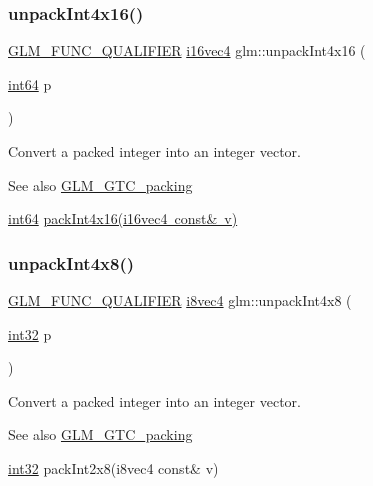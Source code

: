 \subsubsection{\texorpdfstring{unpack\+Int4x16()}{unpackInt4x16()}}
{\footnotesize\ttfamily \mbox{\hyperlink{setup_8hpp_a33fdea6f91c5f834105f7415e2a64407}{G\+L\+M\+\_\+\+F\+U\+N\+C\+\_\+\+Q\+U\+A\+L\+I\+F\+I\+ER}} \mbox{\hyperlink{group__gtc__type__precision_ga99a249a4cc129cb527c48d3afd38b666}{i16vec4}} glm\+::unpack\+Int4x16 (\begin{DoxyParamCaption}\item[{\mbox{\hyperlink{group__gtc__type__precision_ga435d75819cce297cc5fa21bd84ef89a5}{int64}}}]{p }\end{DoxyParamCaption})}

Convert a packed integer into an integer vector.

\begin{DoxySeeAlso}{See also}
\mbox{\hyperlink{group__gtc__packing}{G\+L\+M\+\_\+\+G\+T\+C\+\_\+packing}} 

\mbox{\hyperlink{group__gtc__type__precision_ga435d75819cce297cc5fa21bd84ef89a5}{int64}} \mbox{\hyperlink{group__gtc__packing_gac3ef78d62735b5c34503c33e37e401c2}{pack\+Int4x16(i16vec4 const\& v)}} 
\end{DoxySeeAlso}
\mbox{\label{group__gtc__packing_gaeed27076c5d26f4cca0d06637d3e878c}} 
\subsubsection{\texorpdfstring{unpack\+Int4x8()}{unpackInt4x8()}}
{\footnotesize\ttfamily \mbox{\hyperlink{setup_8hpp_a33fdea6f91c5f834105f7415e2a64407}{G\+L\+M\+\_\+\+F\+U\+N\+C\+\_\+\+Q\+U\+A\+L\+I\+F\+I\+ER}} \mbox{\hyperlink{group__gtc__type__precision_gaaad99cfb998ddcb74e9c33d0149fdd0e}{i8vec4}} glm\+::unpack\+Int4x8 (\begin{DoxyParamCaption}\item[{\mbox{\hyperlink{group__gtc__type__precision_ga632d8b25f6b61659f39ea4321fab92a4}{int32}}}]{p }\end{DoxyParamCaption})}

Convert a packed integer into an integer vector.

\begin{DoxySeeAlso}{See also}
\mbox{\hyperlink{group__gtc__packing}{G\+L\+M\+\_\+\+G\+T\+C\+\_\+packing}} 

\mbox{\hyperlink{group__gtc__type__precision_ga632d8b25f6b61659f39ea4321fab92a4}{int32}} pack\+Int2x8(i8vec4 const\& v) 
\end{DoxySeeAlso}
\mbox{\label{group__gtc__packing_ga5c1ec97894b05ea21a05aea4f0204a02}} 
